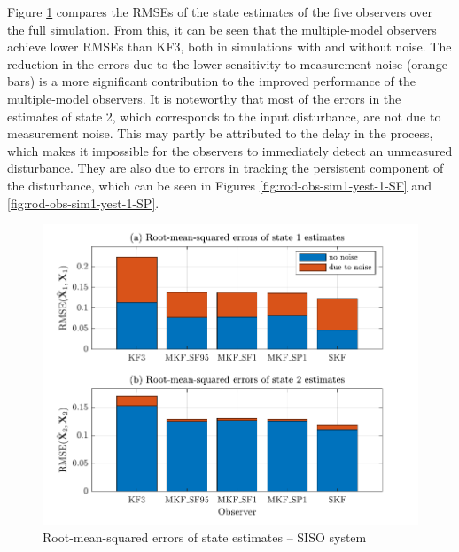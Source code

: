 Figure \ref{fig:rod-obs-sim1-xest-RMSE-bar} compares the \gls{RMSE}s of the state estimates of the five observers over the full simulation. From this, it can be seen that the multiple-model observers achieve lower RMSEs than KF3, both in simulations with and without noise. The reduction in the errors due to the lower sensitivity to measurement noise (orange bars) is a more significant contribution to the improved performance of the multiple-model observers. It is noteworthy that most of the errors in the estimates of state 2, which corresponds to the input disturbance, are not due to measurement noise. This may partly be attributed to the delay in the process, which makes it impossible for the observers to immediately detect an unmeasured disturbance. They are also due to errors in tracking the persistent component of the disturbance, which can be seen in Figures \ref{fig:rod-obs-sim1-yest-1-SF} and \ref{fig:rod-obs-sim1-yest-1-SP}.
\begin{figure}[htp]
	\centering
	\includegraphics[width=12cm]{images/rod_obs_sim1_all_seed_x_err_bar.pdf}
	\caption{Root-mean-squared errors of state estimates – SISO system}
	\label{fig:rod-obs-sim1-xest-RMSE-bar}
\end{figure}

